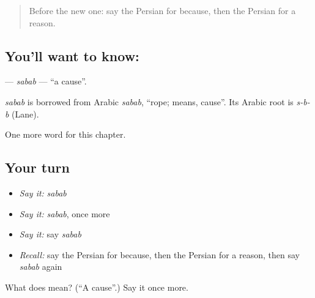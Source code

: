 \begin{quote}
Before the new one: say the Persian for because, then the Persian for a reason.
\end{quote}

\subsection*{You'll want to know: }
\textbf{} — \emph{sabab} — \textquotedblleft{}a cause\textquotedblright{}.

\begin{cousinweb}
\emph{sabab} is borrowed from Arabic \emph{sabab}, \textquotedblleft{}rope; means, cause\textquotedblright{}. Its Arabic root is \emph{s-b-b} (Lane).
\end{cousinweb}

\begin{grammarlens}[title={What you've built}]
One more word for this chapter.
\end{grammarlens}

\subsection*{Your turn}
\begin{itemize}
\raggedright
  \item \emph{Say it:} \emph{sabab}
  \item \emph{Say it:} \emph{sabab}, once more
  \item \emph{Say it:} say \emph{sabab}
  \item \emph{Recall:} say the Persian for because, then the Persian for a reason, then say \emph{sabab} again
\end{itemize}

\begin{tcolorbox}[breakable,colback=teal!4,colframe=teal!35!black,title={Before you move on}]
What does  mean? (\textquotedblleft{}A cause\textquotedblright{}.) Say it once more.
\end{tcolorbox}
